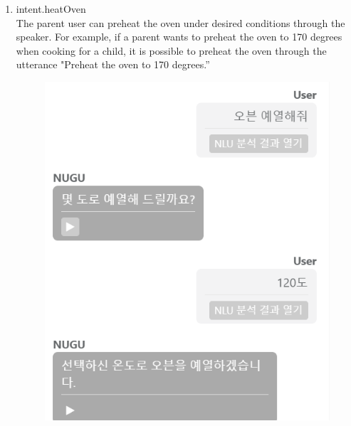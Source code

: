 \documentclass[conference]{IEEEtran}
\begin{document}
\begin{enumerate}
\begin{enumerate}
\begin{enumerate}
                \item intent.heatOven
                \\The parent user can preheat the oven under desired conditions through the speaker. For example, if a parent wants to preheat the oven to 170 degrees when cooking for a child, it is possible to preheat the oven through the utterance "Preheat the oven to 170 degrees.”
                \begin{figure}[H]
            \centering
            \includegraphics[scale=0.5]{new_assets/nugu-play-oven.png}
            \end{figure}
                

\end{enumerate}
\end{enumerate}
\end{enumerate}
\end{document}
